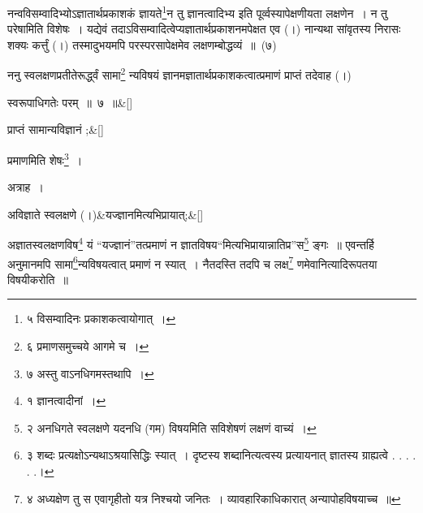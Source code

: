 \documentclass[article,12pt,a4paper]{memoir}
\begin{document}
	  \pstart नन्वविसम्वादिभ्योऽज्ञातार्थप्रकाशकं ज्ञायते\footnote{\label{pvv.8-5}  ५ विसम्वादिनः प्रकाशकत्वायोगात् ।}न तु ज्ञानत्वादिभ्य इति पूर्व्वस्यापेक्षणीयता लक्षणेन । न तु परेषामिति विशेषः । यद्येवं तदाऽविसम्वादित्वेप्यज्ञातार्थप्रकाशनमपेक्षत एव (।) नान्यथा सांवृतस्य निरासः शक्यः कर्त्तुं (।) तस्मादुभयमपि परस्परसापेक्षमेव लक्षणम्बोद्धव्यं ॥ (७)
	\pend
      \label{div_pvv.1.8}
	  
	

	  \pstart ननु स्वलक्षणप्रतीतेरूर्द्ध्वं सामा\footnote{\label{pvv.8-6}  ६ प्रमाणसमुच्चये आगमे च ।} न्यविषयं ज्ञानमज्ञातार्थप्रकाशकत्वात्प्रमाणं प्राप्तं तदेवाह (।)
	\pend
      
	  \bigskip
	  \begingroup
	
	    \large
	  
	    
	    \stanza[\smallbreak]
	\label{pv.1.7d}स्वरूपाधिगतेः परम् ॥ ७ ॥\&[\smallbreak]


	
	  \endgroup
	
	  \bigskip
	  \begingroup
	
	    \large
	  
	    
	    \stanza[\smallbreak]
	\label{pv.1.8a}प्राप्तं सामान्यविज्ञानं ;\&[\smallbreak]


	
	  \endgroup
	

	  \pstart प्रमाणमिति शेषः\footnote{\label{pvv.8-7}  ७ अस्तु वाऽनधिगमस्तथापि ।} ।
	\pend
      

	  \pstart अत्राह ।
	\pend
      
	  \bigskip
	  \begingroup
	
	    \large
	  
	    
	    \stanza[\smallbreak]
	\label{pv.1.8b}अविज्ञाते स्वलक्षणे (।)&यज्ज्ञानमित्यभिप्रायात्;\&[\smallbreak]


	
	  \endgroup
	\leavevmode{}

	  \pstart अज्ञातस्वलक्षणविष\footnote{\label{pvv.9-1}  १ ज्ञानत्वादीनां ।} यं {\color{DodgerBlue3}“यज्ज्ञानं”}तत्प्रमाणं न ज्ञातविषय{\color{DodgerBlue3}“मित्यभिप्रायान्नातिप्र”}स\footnote{\label{pvv.9-2}  २ अनधिगते स्वलक्षणे यदनधि (गम) विषयमिति सविशेषणं लक्षणं वाच्यं ।} ङ्गः ॥ एवन्तर्हि अनुमानमपि सामा\footnote{\label{pvv.9-3}  ३ शब्दः प्रत्यक्षोऽन्यथाऽश्रयासिद्धिः स्यात् । दृष्टस्य शब्दानित्यत्वस्य प्रत्यायनात् ज्ञातस्य ग्राह्यत्वे . . . . . .।}न्यविषयत्वात् प्रमाणं न स्यात् । नैतदस्ति तदपि च लक्ष\footnote{\label{pvv.9-4}  ४ अध्यक्षेण तु स एवागृहीतो यत्र निश्चयो जनितः । व्यावहारिकाधिकारात् अन्यापोहविषयाच्च ॥} णमेवानित्यादिरूपतया विषयीकरोति ॥
	\pend
      \leavevmode{}
\end{document}
